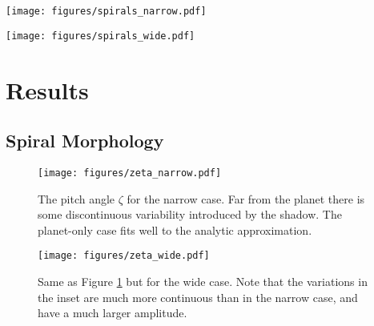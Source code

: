 \documentclass[twocolumn]{aastex631}
\begin{document}
\begin{figure*}
    \texttt{[image: figures/spirals\_narrow.pdf]}
    
    \caption{
        Spiral patterns observed after 99.25 orbits in the narrow shadow case. Shown is the density anomaly for every case.
        The third panel from the left shows the residuals after subtracting the first panel from the second. Plotted on the two
        rightmost panels are the locations identified as being at the peak of the spiral. Note that the color scale on the leftmost
        two panels has been scaled so that all panels can share the same colorbar.
    }
    \label{fig:sp_narrow}
\end{figure*}

\begin{figure*}
    \texttt{[image: figures/spirals\_wide.pdf]}
    \caption{ Same as Figure \ref{fig:sp_narrow} but for the wide shadow case.}
    \label{fig:sp_wide}
\end{figure*}

\section{Results}
\label{sec:results}

\subsection{Spiral Morphology}

\begin{figure}
    \begin{center}
        \texttt{[image: figures/zeta\_narrow.pdf]}
        \caption{
            The pitch angle $\zeta$ for the narrow case. Far from the planet there is some discontinuous variability introduced by the shadow.
            The planet-only case fits well to the analytic approximation.
        }
        \label{fig:zeta_narrow}
    \end{center}
\end{figure}


\begin{figure}
    \begin{center}
        \texttt{[image: figures/zeta\_wide.pdf]}
        \caption{
            Same as Figure \ref{fig:zeta_narrow} but for the wide case. Note that the variations in the inset are much more continuous than in the
            narrow case, and have a much larger amplitude.
        }
        \label{fig:zeta_wide}
    \end{center}
\end{figure}
\end{document}
